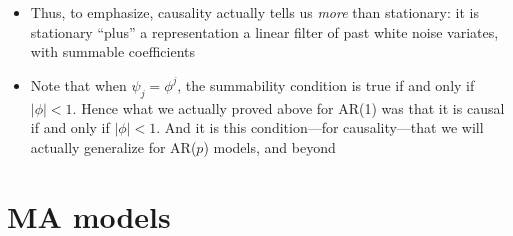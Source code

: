 \documentclass{article}
\begin{document}
\begin{itemize}
\item Thus, to emphasize, causality actually tells us \emph{more} than
  stationary: it is stationary ``plus'' a representation a linear filter of past
  white noise variates, with summable coefficients

\item Note that when $\psi_j = \phi^j$, the summability condition
   is true if and only if $|\phi| <
  1$. Hence what we actually proved above for AR(1) was that it is causal if and
  only if $|\phi| < 1$. And it is this condition---for causality---that we will
  actually generalize for AR($p$) models, and beyond 
\end{itemize}

\section{MA models}
\end{document}

